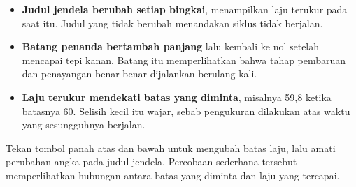 \begin{itemize}
  \item \textbf{Judul jendela berubah setiap bingkai}, menampilkan laju
        terukur pada saat itu. Judul yang tidak berubah menandakan siklus
        tidak berjalan.
  \item \textbf{Batang penanda bertambah panjang} lalu kembali ke nol setelah
        mencapai tepi kanan. Batang itu memperlihatkan bahwa tahap pembaruan
        dan penayangan benar-benar dijalankan berulang kali.
  \item \textbf{Laju terukur mendekati batas yang diminta}, misalnya 59,8
        ketika batasnya 60. Selisih kecil itu wajar, sebab pengukuran
        dilakukan atas waktu yang sesungguhnya berjalan.
\end{itemize}

Tekan tombol panah atas dan bawah untuk mengubah batas laju, lalu amati
perubahan angka pada judul jendela. Percobaan sederhana tersebut memperlihatkan
hubungan antara batas yang diminta dan laju yang tercapai.
